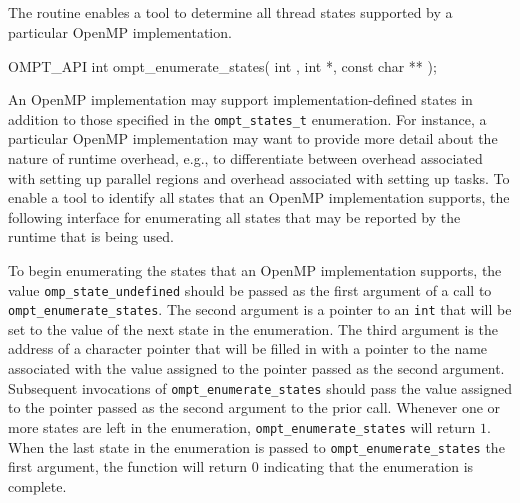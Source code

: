  \subsection{}
 \label{ompt_enumerate_states}
 \summary
 
The  routine enables a tool 
to determine all thread states supported by a particular OpenMP 
implementation.

\format

\ccppspecificstart
\begin{boxedcode}
OMPT_API int ompt_enumerate_states(
  int , 
  int *, 
  const char **
);
\end{boxedcode}
\ccppspecificend

\effect

An OpenMP implementation may support implementation-defined states in 
addition to those specified in the \verb|ompt_states_t| enumeration.
For instance, a particular OpenMP implementation may want to 
provide more detail about the nature of runtime overhead, 
e.g., to differentiate between overhead associated with setting up 
parallel regions
and overhead associated with setting up tasks. 
To enable a tool to identify all states that an OpenMP implementation
supports, the following interface for enumerating all states that may be reported by the runtime that is being used.


\constraints

To begin enumerating the states that an OpenMP implementation supports,
the value \verb|omp_state_undefined| should be passed as the
first argument of a call to \verb|ompt_enumerate_states|.
The second argument is a pointer to an \verb|int| 
that will be set to the value of the next state in the enumeration.
The third argument is the address of a character pointer
that will be filled in with a pointer to the name associated with 
the value assigned to the pointer passed as the second argument.
Subsequent invocations of \verb|ompt_enumerate_states| should pass the value 
assigned to the pointer passed as the second argument to the prior call.
Whenever one or more states are left in the enumeration, \verb|ompt_enumerate_states| will return $1$.
When the last state in the enumeration is passed 
to \verb|ompt_enumerate_states| the first argument, 
the function will return $0$ 
indicating that the enumeration is complete.

